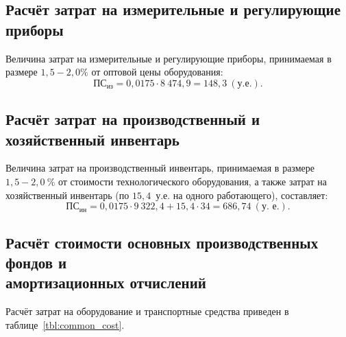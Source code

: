 \subsection{Расчёт затрат на измерительные и регулирующие приборы}

Величина затрат на измерительные и регулирующие приборы,
принимаемая в размере $1{,}5-2{,}0\%$ от
оптовой цены оборудования:
\begin{equation*}
  \text{ПС}_{\text{из}} = 0{,}0175 \cdot 8~474{,}9 = 148{,}3 ~(\text{у.е.}).
\end{equation*}


\subsection{Расчёт затрат на производственный и хозяйственный инвентарь}

Величина затрат на производственный инвентарь,
принимаемая в размере $1{,}5-2{,}0~\%$ от
стоимости технологического оборудования, а также
затрат на хозяйственный инвентарь
(по $15{,}4$~у.е. на одного работающего), составляет:
\begin{equation*}
  \text{ПС}_{\text{ин}} =
  0{,}0175 \cdot 9~322{,}4 + 15{,}4 \cdot 34 = 686{,}74~(\text{у.~е.}).
\end{equation*}

\subsection{Расчёт стоимости основных производственных фондов и \\
амортизационных отчислений}

Расчёт затрат на оборудование и транспортные средства
приведен в таблице~\ref{tbl:common_cost}.

